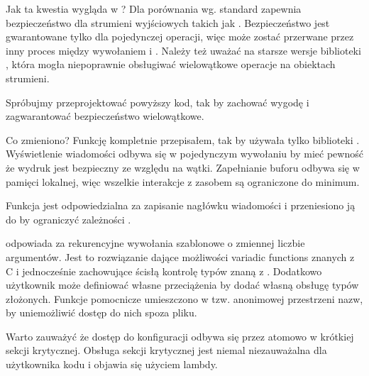 Jak ta kwestia wygląda w \Cpp{} ?
Dla porównania wg.  standard zapewnia bezpieczeństwo dla strumieni wyjściowych takich jak . Bezpieczeństwo jest gwarantowane tylko dla pojedynczej operacji, więc  może zostać przerwane przez inny proces między wywołaniem  i . Należy też uważać na starsze wersje biblioteki , która mogła niepoprawnie obsługiwać wielowątkowe operacje na obiektach strumieni.

Spróbujmy przeprojektować powyższy kod, tak by zachować wygodę  i zagwarantować bezpieczeństwo wielowątkowe.

Co zmieniono?
Funkcję  kompletnie przepisałem, tak by używała tylko biblioteki \Cpp{}. Wyświetlenie wiadomości odbywa się w pojedynczym wywołaniu  by mieć pewność że wydruk jest bezpieczny ze względu na wątki. Zapełnianie buforu  odbywa się w pamięci lokalnej, więc wszelkie interakcje z zasobem  są ograniczone do minimum.

Funkcja  jest odpowiedzialna za zapisanie nagłówku wiadomości i przeniesiono ją do  by ograniczyć zależności .

 odpowiada za rekurencyjne wywołania szablonowe o zmiennej liczbie argumentów. Jest to rozwiązanie dające możliwości variadic functions znanych z C i jednocześnie zachowujące ścisłą kontrolę typów znaną z \Cpp{}. Dodatkowo użytkownik może definiować własne przeciążenia  by dodać własną obsługę typów złożonych. Funkcje pomocnicze umieszczono w tzw. anonimowej przestrzeni nazw, by uniemożliwić dostęp do nich spoza pliku.

Warto zauważyć że dostęp do konfiguracji odbywa się przez  atomowo w krótkiej sekcji krytycznej. Obsługa sekcji krytycznej jest niemal niezauważalna dla użytkownika kodu i objawia się użyciem lambdy.

